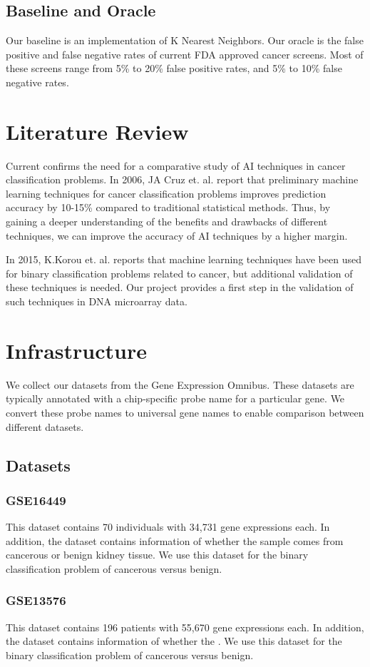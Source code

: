 \documentclass[12pt]{scrartcl}
\begin{document}
    \subsection{Baseline and Oracle}
Our baseline is an implementation of K Nearest Neighbors. Our oracle is the false positive and false negative rates of current FDA approved cancer screens. Most of these screens range from 5\% to 20\% false positive rates, and 5\% to 10\% false negative rates. 
    \section{Literature Review}
    Current confirms the need for a comparative study of AI techniques in cancer classification problems. In 2006, JA Cruz et. al. report that preliminary machine learning techniques for cancer classification problems improves prediction accuracy by 10-15\% compared to traditional statistical methods. Thus, by gaining a deeper understanding of the benefits and drawbacks of different techniques, we can improve the accuracy of AI techniques by a higher margin.
    
    In 2015, K.Korou et. al. reports that machine learning techniques have been used for binary classification problems related to cancer, but additional validation of these techniques is needed. Our project provides a first step in the validation of such techniques in DNA microarray data.
    \section{Infrastructure}
    We collect our datasets from the Gene Expression Omnibus. These datasets are typically annotated with a chip-specific probe name for a particular gene. We convert these probe names to universal gene names to enable comparison between different datasets. 
    \subsection{Datasets}
    \subsubsection{GSE16449}
    This dataset contains 70 individuals with 34,731 gene expressions each. In addition, the dataset contains information of whether the sample comes from cancerous or benign kidney tissue. We use this dataset for the binary classification problem of cancerous versus benign.
    \subsubsection{GSE13576}
    This dataset contains 196 patients with 55,670 gene expressions each. In addition, the dataset contains information of whether the . We use this dataset for the binary classification problem of cancerous versus benign.
\end{document}

